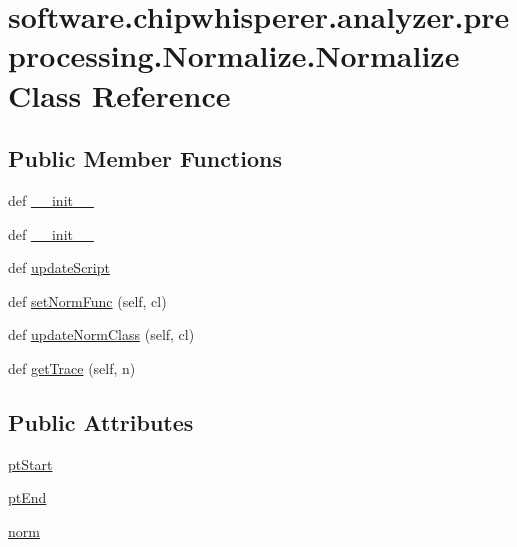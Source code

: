 \hypertarget{classsoftware_1_1chipwhisperer_1_1analyzer_1_1preprocessing_1_1Normalize_1_1Normalize}{}\section{software.\+chipwhisperer.\+analyzer.\+preprocessing.\+Normalize.\+Normalize Class Reference}
\label{classsoftware_1_1chipwhisperer_1_1analyzer_1_1preprocessing_1_1Normalize_1_1Normalize}
\subsection*{Public Member Functions}
\begin{DoxyCompactItemize}
\item 
def \hyperlink{classsoftware_1_1chipwhisperer_1_1analyzer_1_1preprocessing_1_1Normalize_1_1Normalize_aeab595cbe0958169ccf447b5a29991d5}{\+\_\+\+\_\+init\+\_\+\+\_\+}
\item 
def \hyperlink{classsoftware_1_1chipwhisperer_1_1analyzer_1_1preprocessing_1_1Normalize_1_1Normalize_aeab595cbe0958169ccf447b5a29991d5}{\+\_\+\+\_\+init\+\_\+\+\_\+}
\item 
def \hyperlink{classsoftware_1_1chipwhisperer_1_1analyzer_1_1preprocessing_1_1Normalize_1_1Normalize_a9d55073a613e857bac04de9bdf27bda5}{update\+Script}
\item 
def \hyperlink{classsoftware_1_1chipwhisperer_1_1analyzer_1_1preprocessing_1_1Normalize_1_1Normalize_a9d1a30dff4c4efd3d8d44e8fb7fd9c1a}{set\+Norm\+Func} (self, cl)
\item 
def \hyperlink{classsoftware_1_1chipwhisperer_1_1analyzer_1_1preprocessing_1_1Normalize_1_1Normalize_ae8055db9d0bfe78cc4a176f1fc5de36b}{update\+Norm\+Class} (self, cl)
\item 
def \hyperlink{classsoftware_1_1chipwhisperer_1_1analyzer_1_1preprocessing_1_1Normalize_1_1Normalize_a31edad6c750076e0de2e508829f26156}{get\+Trace} (self, n)
\end{DoxyCompactItemize}
\subsection*{Public Attributes}
\begin{DoxyCompactItemize}
\item 
\hyperlink{classsoftware_1_1chipwhisperer_1_1analyzer_1_1preprocessing_1_1Normalize_1_1Normalize_a6fb33271683cfc2543556e4bb95088ec}{pt\+Start}
\item 
\hyperlink{classsoftware_1_1chipwhisperer_1_1analyzer_1_1preprocessing_1_1Normalize_1_1Normalize_a79ca86394e336e12db727309a0c808c6}{pt\+End}
\item 
\hyperlink{classsoftware_1_1chipwhisperer_1_1analyzer_1_1preprocessing_1_1Normalize_1_1Normalize_a51aec3d50e321c171d7b9369d5805194}{norm}
\end{DoxyCompactItemize}


